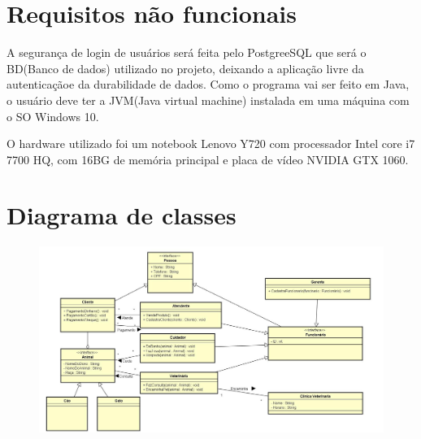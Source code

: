 \documentclass[12pt]{article}
\begin{document}
 
 \section{Requisitos não funcionais}%
 A segurança de login de usuários será feita pelo PostgreeSQL que será o BD(Banco de dados) utilizado no projeto, deixando a aplicação livre da autenticaçãoe da durabilidade de dados. Como o programa vai ser feito em Java, o usuário deve ter a JVM(Java virtual machine) instalada em uma máquina com o SO Windows 10.
 
 O hardware utilizado foi um notebook Lenovo Y720 com processador Intel core i7 7700 HQ, com 16BG de memória principal e placa de vídeo NVIDIA GTX 1060.
 
 

 \section{Diagrama de classes}
 \begin{flushleft}
 
 \begin{figure}[!h]
     \centering
     \includegraphics[scale=0.43,angle=90]{Diagrama.jpg}
\end{figure}
 \end{flushleft} 
\end{document}
